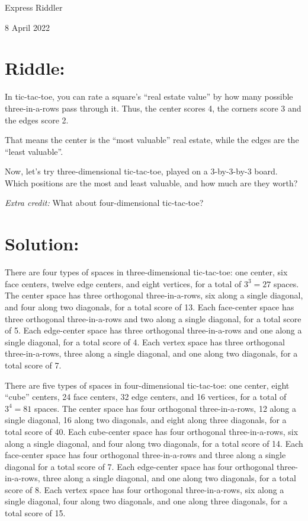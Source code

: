 \documentclass{article}
\begin{document}
\pagestyle{empty} %

\begin{center}
{\LARGE Express Riddler}

\vspace{0.15in}

{\Large 8 April 2022}
\end{center}


\section*{Riddle:}

In tic-tac-toe, you can rate a square's ``real estate value'' by how many possible three-in-a-rows pass through it.
Thus, the center scores 4, the corners score 3 and the edges score 2.

That means the center is the ``most valuable'' real estate, while the edges are the ``least valuable''.

Now, let's try three-dimensional tic-tac-toe, played on a 3-by-3-by-3 board.
Which positions are the most and least valuable, and how much are they worth?

\textit{Extra credit:} What about four-dimensional tic-tac-toe?


\section*{Solution:}

There are four types of spaces in three-dimensional tic-tac-toe:
one center, six face centers, twelve edge centers, and eight vertices, for a total of $3^{3}=27$ spaces.
The center space has three orthogonal three-in-a-rows, six along a single diagonal, and four along two diagonals, for a total score of 13.
Each face-center space has three orthogonal three-in-a-rows and two along a single diagonal, for a total score of 5.
Each edge-center space has three orthogonal three-in-a-rows and one along a single diagonal, for a total score of 4.
Each vertex space has three orthogonal three-in-a-rows, three along a single diagonal, and one along two diagonals, for a total score of 7.

There are five types of spaces in four-dimensional tic-tac-toe:
one center, eight ``cube'' centers, 24 face centers, 32 edge centers, and 16 vertices, for a total of $3^{4}=81$ spaces.
The center space has four orthogonal three-in-a-rows, 12 along a single diagonal, 16 along two diagonals, and eight along three diagonals, for a total score of 40.
Each cube-center space has four orthogonal three-in-a-rows, six along a single diagonal, and four along two diagonals, for a total score of 14.
Each face-center space has four orthogonal three-in-a-rows and three along a single diagonal for a total score of 7.
Each edge-center space has four orthogonal three-in-a-rows, three along a single diagonal, and one along two diagonals, for a total score of 8.
Each vertex space has four orthogonal three-in-a-rows, six along a single diagonal, four along two diagonals, and one along three diagonals, for a total score of 15.
\end{document}
